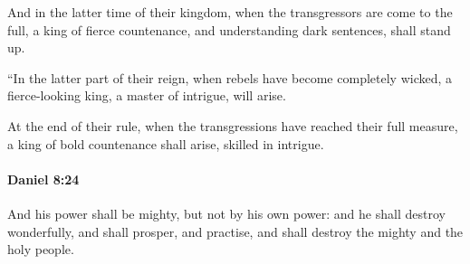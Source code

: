			\begin{versebox}
					\item[BHS] 
					\item[LXX] 
					\item[ASV] And in the latter time of their kingdom, when the transgressors are come to the full, a king of fierce countenance, and understanding dark sentences, shall stand up.
					\item[NIV] “In the latter part of their reign, when rebels have become completely wicked, a fierce-looking king, a master of intrigue, will arise.
					\item[NRSV] At the end of their rule, when the transgressions have reached their full measure, a king of bold countenance shall arise, skilled in intrigue.
			\end{versebox}

		\paragraph{Daniel 8:24} %
			\label{DANIEL-8-24}

			And his power shall be mighty, but not by his own power: and he shall destroy wonderfully, and shall prosper, and practise, and shall destroy the mighty and the holy people.

